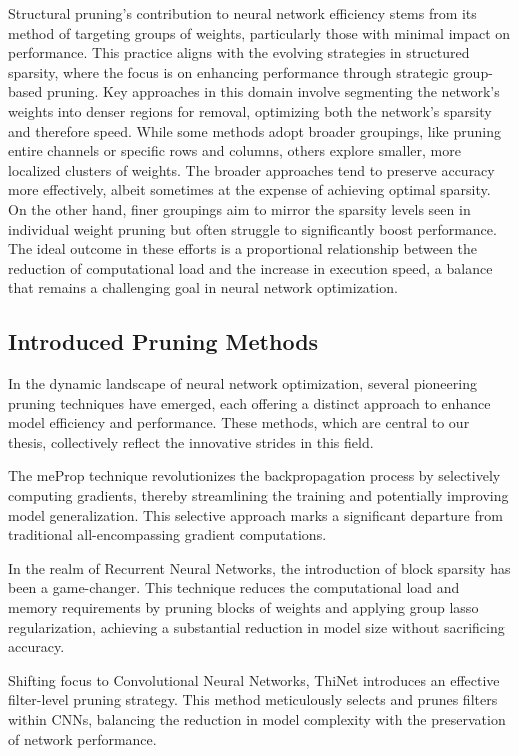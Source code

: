 Structural pruning's contribution to neural network efficiency stems from its method of targeting groups of weights, particularly those with minimal impact on performance. This practice aligns with the evolving strategies in structured sparsity, where the focus is on enhancing performance through strategic group-based pruning. Key approaches in this domain involve segmenting the network's weights into denser regions for removal, optimizing both the network's sparsity and therefore speed. While some methods adopt broader groupings, like pruning entire channels or specific rows and columns, others explore smaller, more localized clusters of weights. The broader approaches tend to preserve accuracy more effectively, albeit sometimes at the expense of achieving optimal sparsity. On the other hand, finer groupings aim to mirror the sparsity levels seen in individual weight pruning but often struggle to significantly boost performance. The ideal outcome in these efforts is a proportional relationship between the reduction of computational load and the increase in execution speed, a balance that remains a challenging goal in neural network optimization.

\subsection{Introduced Pruning Methods}

In the dynamic landscape of neural network optimization, several pioneering pruning techniques have emerged, each offering a distinct approach to enhance model efficiency and performance. These methods, which are central to our thesis, collectively reflect the innovative strides in this field.

The meProp technique revolutionizes the backpropagation process by selectively computing gradients, thereby streamlining the training and potentially improving model generalization. This selective approach marks a significant departure from traditional all-encompassing gradient computations.

In the realm of Recurrent Neural Networks, the introduction of block sparsity has been a game-changer. This technique reduces the computational load and memory requirements by pruning blocks of weights and applying group lasso regularization, achieving a substantial reduction in model size without sacrificing accuracy.

Shifting focus to Convolutional Neural Networks, ThiNet introduces an effective filter-level pruning strategy. This method meticulously selects and prunes filters within CNNs, balancing the reduction in model complexity with the preservation of network performance.

